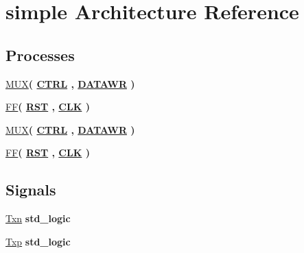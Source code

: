\hypertarget{class_right_shft_1_1simple}{}\section{simple Architecture Reference}
\label{class_right_shft_1_1simple}
\subsection*{Processes}
 \begin{DoxyCompactItemize}
\item 
\hyperlink{class_right_shft_1_1simple_af20627f9e7e464b14f4082eb9a23720e}{M\+U\+X}{\bfseries  ( {\bfseries {\bfseries \hyperlink{class_right_shft_a391405efff6be710026e84afd96734c7}{C\+T\+R\+L}} \textcolor{vhdlchar}{ }} , {\bfseries {\bfseries \hyperlink{class_right_shft_a7671d0cfbe49b836aa8bfd98c0477dfa}{D\+A\+T\+A\+W\+R}} \textcolor{vhdlchar}{ }} )}
\item 
\hyperlink{class_right_shft_1_1simple_a596f3c3b24f9699291119d701202e7d2}{F\+F}{\bfseries  ( {\bfseries {\bfseries \hyperlink{class_right_shft_a98682ef7de2714e5bab788a2e2ff1b7f}{R\+S\+T}} \textcolor{vhdlchar}{ }} , {\bfseries {\bfseries \hyperlink{class_right_shft_ab5d0ea9e968d49d94da9db07a979d402}{C\+L\+K}} \textcolor{vhdlchar}{ }} )}
\item 
\hyperlink{class_right_shft_1_1simple_af20627f9e7e464b14f4082eb9a23720e}{M\+U\+X}{\bfseries  ( {\bfseries {\bfseries \hyperlink{class_right_shft_a391405efff6be710026e84afd96734c7}{C\+T\+R\+L}} \textcolor{vhdlchar}{ }} , {\bfseries {\bfseries \hyperlink{class_right_shft_a7671d0cfbe49b836aa8bfd98c0477dfa}{D\+A\+T\+A\+W\+R}} \textcolor{vhdlchar}{ }} )}
\item 
\hyperlink{class_right_shft_1_1simple_a596f3c3b24f9699291119d701202e7d2}{F\+F}{\bfseries  ( {\bfseries {\bfseries \hyperlink{class_right_shft_a98682ef7de2714e5bab788a2e2ff1b7f}{R\+S\+T}} \textcolor{vhdlchar}{ }} , {\bfseries {\bfseries \hyperlink{class_right_shft_ab5d0ea9e968d49d94da9db07a979d402}{C\+L\+K}} \textcolor{vhdlchar}{ }} )}
\end{DoxyCompactItemize}
\subsection*{Signals}
 \begin{DoxyCompactItemize}
\item 
\hyperlink{class_right_shft_1_1simple_ac693744b91e05be47ae646fb6c8e2a93}{Txn} {\bfseries \textcolor{comment}{std\+\_\+logic}\textcolor{vhdlchar}{ }} 
\item 
\hyperlink{class_right_shft_1_1simple_a7b4bfd6ce4a8352fa0dadba415546d17}{Txp} {\bfseries \textcolor{comment}{std\+\_\+logic}\textcolor{vhdlchar}{ }} 
\end{DoxyCompactItemize}


